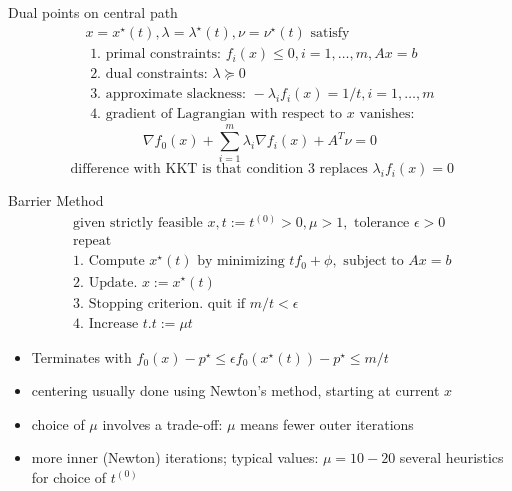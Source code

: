 \documentclass{beamer}
\begin{document}
\begin{frame}[noframenumbering]{Dual points on central path}
\begin{equation*}
\begin{array}{l}{x=x^{\star}(t), \lambda=\lambda^{\star}(t), \nu=\nu^{\star}(t) \text { satisfy }} \\ {\text { 1. primal constraints: } f_{i}(x) \leq 0, i=1, \ldots, m, A x=b} \\ {\text { 2. dual constraints: } \lambda \succeq 0} \\ {\text { 3. approximate slackness: }
-\lambda_{i} f_{i}(x)=1 / t, i=1, \ldots, m} \\ {\text { 4. gradient of Lagrangian with respect to } x \text { vanishes: }}\end{array}
\end{equation*}
\begin{equation*}
\nabla f_{0}(x)+\sum_{i=1}^{m} \lambda_{i} \nabla f_{i}(x)+A^{T} \nu=0
\end{equation*}
\begin{equation*}
\text { difference with } \mathrm{KKT} \text { is that condition } 3 \text { replaces } \lambda_{i} f_{i}(x)=0
\end{equation*}
\end{frame}


\begin{frame}[noframenumbering]{Barrier Method}
\begin{equation*}
\begin{array}{l}{\text { given strictly feasible } x, t:=t^{(0)}>0, \mu>1, \text { tolerance } \epsilon>0} \\ {\text { repeat }} \\ {\text { 1. Compute } x^{\star}(t) \text { by minimizing } t f_{0}+\phi, \text { subject to } A x=b} \\ {\text { 2. Update. } x:=x^{\star}(t)} \\ {\text { 3. Stopping criterion. quit if } m / t<\epsilon} \\ {\text { 4. Increase } t . t:=\mu t}\end{array}
\end{equation*}

\begin{itemize}
\item Terminates with $ f_{0}(x)-p^{\star} \leq \epsilon   f_{0}\left(x^{\star}(t)\right)-p^{\star} \leq m / t$
\item centering usually done using Newton's method, starting at current $x$
\item choice of $\mu$  involves a trade-off: $ \mu$ means fewer outer iterations
\item  more inner (Newton) iterations; typical values:  $\mu=10-20$ several heuristics for choice of $ t^{(0)}$
\end{itemize}
\end{frame}
\end{document}

